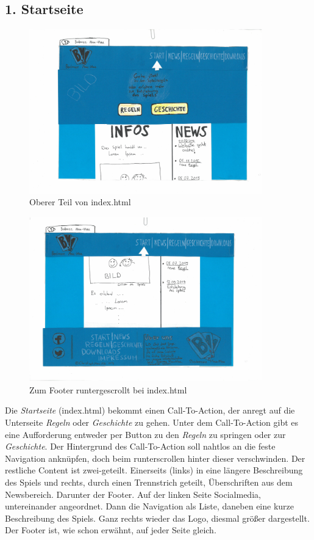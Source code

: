 \documentclass{scrartcl}
\begin{document}
  \subsection*{1. Startseite}
 \begin{figure}[H]
 \begin{center}
 \includegraphics[width=0.9\textwidth]{start-oben.jpg}
\caption{Oberer Teil von index.html}
 \end{center}
\end{figure}
 \begin{figure}[H]
 \begin{center}
 \includegraphics[width=0.9\textwidth, angle = 180, ]{start-unten.jpg}
\caption{Zum Footer runtergescrollt bei index.html}
 \end{center}
\end{figure}
Die \textit{Startseite} (index.html) bekommt einen Call-To-Action, der anregt auf die Unterseite \textit{Regeln} oder \textit{Geschichte} zu gehen. Unter dem Call-To-Action gibt es eine Aufforderung entweder per Button zu den \textit{Regeln} zu springen oder zur \textit{Geschichte}. Der Hintergrund des Call-To-Action soll nahtlos an die feste Navigation anknüpfen, doch beim runterscrollen hinter dieser verschwinden. Der restliche Content ist zwei-geteilt. Einerseits (links) in eine längere Beschreibung des Spiels und rechts, durch einen Trennstrich geteilt, Überschriften aus dem Newsbereich. 
  Darunter der Footer. Auf der linken Seite Socialmedia, untereinander angeordnet. Dann die Navigation als Liste, daneben eine kurze Beschreibung des Spiels. Ganz rechts wieder das Logo, diesmal größer dargestellt. Der Footer ist, wie schon erwähnt, auf jeder Seite gleich. 
\end{document}
